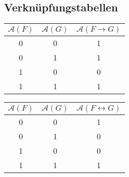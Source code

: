 \documentclass{article}
\begin{document}
	\subsection{Verknüpfungstabellen}
	\begin{tabular}{|c|c|c|}
		\hline
		$\mathcal{A}(F)$ & $\mathcal{A}(G)$ & $\mathcal{A}(F \rightarrow G)$ \\
		\hline
		0 & 0 & 1 \\
		0 & 1 & 1 \\
		1 & 0 & 0 \\
		1 & 1 & 1 \\
		\hline
	\end{tabular}
		\begin{tabular}{|c|c|c|}
		\hline
		$\mathcal{A}(F)$ & $\mathcal{A}(G)$ & $\mathcal{A}(F \leftrightarrow G)$ \\
		\hline
		0 & 0 & 1 \\
		0 & 1 & 0 \\
		1 & 0 & 0 \\
		1 & 1 & 1 \\
		\hline
	\end{tabular}
\end{document}
